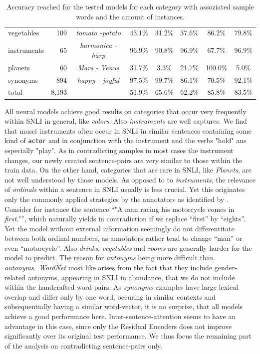 \begin{table}[tph!]
\begin{tabular}{lrc|ccccc}
vegetables & 109 & \textit{tomato -potato} & 43.1\% &31.2\% & 37.6\% & 86.2\% & 79.8\% \\ 
instruments & 65 & \textit{harmonica - harp} & 96.9\% &90.8\% & 96.9\% & 67.7\% & 96.9\% \\ 
planets & 60 & \textit{Mars - Venus} & 31.7\% & 3.3\%& 21.7\% & 100.0\% & 5.0\% \\ 
\midrule
synonyms & 894 & \textit{happy - joyful} & 97.5\% & 99.7\% & 86.1\% & 70.5\% & 92.1\% \\ 
\midrule
total & 8,193 &  & 51.9\% &65.6\% & 62.2\% & 85.8\% & 83.5\% \\ 
\bottomrule
\end{tabular}
\label{tab:acc_by_cat}
\caption{Accuracy reached for the tested models for each category with assoziated sample words and the amount of instances.}
\end{table}
All neural models achieve good results on categories that occur very frequently within \ac{SNLI} in general, like \textit{colors}. Also \textit{instruments} are well captures. We find that musci instruments often occur in SNLI in similar sentences containing some kind of \texttt{actor} and in conjunction with the instrument and the verbs "hold" ans especially "play". As in contradicting samples in most cases the instrument changes, our newly created sentence-pairs are very similar to those within the train data. On the other hand, categories that are rare in \ac{SNLI}, like \textit{Planets}, are not well understood by those models. As opposed to to \textit{instruments}, the relevance of \textit{ordinals} within a sentence in \ac{SNLI} usually is less crucial. Yet this originates only the commonly applied strategies by the annotators as identified by \cite{gururangan2018annotation}. Consider for instance the sentence ``"A man racing his motorcycle comes in \textit{first}."'', which naturally yields in contradiction if we replace ``first'' by ``eights''. Yet the model without external information seemingly do not differentitate between both ordinal numbers, as annotators rather tend to change ``man'' or even ``motorcycle''. Also \textit{drinks}, \textit{vegetables} and \textit{rooms} are generally harder for the model to predict. The reason for \textit{antonyms} being more difficult  than \textit{antonyms\_WordNet} most like arises from the fact that they include gender-related antonyms, appearing in SNLI in abundance, that we do not include within the handcrafted word pairs. As \textit{synonyms} examples have large lexical overlap and differ only by one word, occuring in similar contexts and subsequentially having a similar word-vector, it is no surprise, that all models achieve a good performance here. Inter-sentence-attention seems to have an advantage in this case, since only the Residual Encoders does not improve significantly over its original test performance. We thus focus the remaining part of the analysis on contradicting sentence-pairs only.

